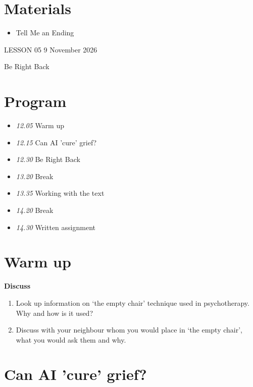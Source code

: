 \documentclass[11pt,a4paper,oneside]{book}
\newcommand{\tasktitle}[1]{{\color{blue}\bfseries #1}\par\smallskip}
\begin{document}
\section*{Materials}

\begin{itemize}
\item Tell Me an Ending
\end{itemize}

\clearpage{}
{\color{blue}\small LESSON 05 \hfill 9 November 2026\par}
\vspace{4mm}
{\displayfont\color{navy}\fontsize{30}{34}\selectfont Be Right Back\par}\vspace{4mm}

\section*{Program}

\begin{itemize}
\item \emph{12.05} Warm up
\item \emph{12.15} Can AI 'cure' grief?
\item \emph{12.30} Be Right Back
\item \emph{13.20} Break
\item \emph{13.35} Working with the text
\item \emph{14.20} Break
\item \emph{14.30} Written assignment
\end{itemize}

\section*{Warm up}
\begin{taskbox}
\tasktitle{Discuss}
\begin{enumerate}
\item Look up information on ‘the empty chair’ technique used in psychotherapy. Why and how is it used?
\item Discuss with your neighbour whom you would place in ‘the empty chair’, what you would ask them and why.
\end{enumerate}
\end{taskbox}

\section*{Can AI 'cure' grief?}
\end{document}
